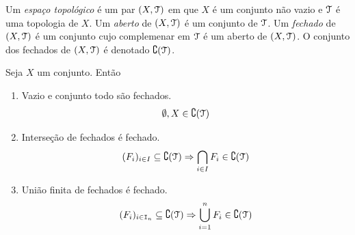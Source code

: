 \begin{defi}
	Um \emph{espaço topológico} é um par $(X,\mathcal{T})$ em que $X$ é um conjunto não vazio e $\mathcal{T}$ é uma topologia de $X$. Um \emph{aberto} de $(X,\mathcal{T})$ é um conjunto de $\mathcal{T}$. Um \emph{fechado} de $(X,\mathcal{T})$ é um conjunto cujo complemenar em $\mathcal{T}$ é um aberto de $(X,\mathcal{T})$. O conjunto dos fechados de $(X,\mathcal{T})$ é denotado $\complement (\mathcal{T})$.
\end{defi}

\begin{prop}
	Seja $X$ um conjunto. Então
	\begin{enumerate}
	\item Vazio e conjunto todo são fechados.
	\begin{equation*}
	\emptyset, X \in \complement (\mathcal{T})
	\end{equation*}

	\item Interseção de fechados é fechado.
	\begin{equation*}
	(F_i)_{i \in I} \subseteq \complement (\mathcal{T}) \Rightarrow \bigcap_{i \in I} F_i  \in \complement (\mathcal{T})
	\end{equation*}
	
	\item União finita de fechados é fechado.
	\begin{equation*}
	(F_i)_{i \in \mathtt I_n} \subseteq \complement (\mathcal{T}) \Rightarrow \bigcup_{i=1}^n F_i \in \complement (\mathcal{T})
	\end{equation*}
	

	\end{enumerate}
\end{prop}
